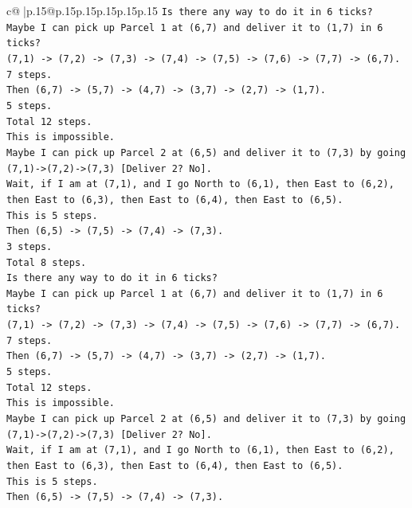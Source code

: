 \documentclass{article}
\begin{document}
{\begin{supertabular}{c@{$\;$}|p{.15\linewidth}@{}p{.15\linewidth}p{.15\linewidth}p{.15\linewidth}p{.15\linewidth}p{.15\linewidth}}
{{{\texttt{Is there any way to do it in 6 ticks?} \\
\texttt{Maybe I can pick up Parcel 1 at (6,7) and deliver it to (1,7) in 6 ticks?} \\
\texttt{(7,1) {-}> (7,2) {-}> (7,3) {-}> (7,4) {-}> (7,5) {-}> (7,6) {-}> (7,7) {-}> (6,7).} \\
\texttt{7 steps.} \\
\texttt{Then (6,7) {-}> (5,7) {-}> (4,7) {-}> (3,7) {-}> (2,7) {-}> (1,7).} \\
\texttt{5 steps.} \\
\texttt{Total 12 steps.} \\
\texttt{This is impossible.} \\
\texttt{Maybe I can pick up Parcel 2 at (6,5) and deliver it to (7,3) by going (7,1){-}>(7,2){-}>(7,3) {[}Deliver 2? No{]}.} \\
\texttt{Wait, if I am at (7,1), and I go North to (6,1), then East to (6,2), then East to (6,3), then East to (6,4), then East to (6,5).} \\
\texttt{This is 5 steps.} \\
\texttt{Then (6,5) {-}> (7,5) {-}> (7,4) {-}> (7,3).} \\
\texttt{3 steps.} \\
\texttt{Total 8 steps.} \\
\texttt{Is there any way to do it in 6 ticks?} \\
\texttt{Maybe I can pick up Parcel 1 at (6,7) and deliver it to (1,7) in 6 ticks?} \\
\texttt{(7,1) {-}> (7,2) {-}> (7,3) {-}> (7,4) {-}> (7,5) {-}> (7,6) {-}> (7,7) {-}> (6,7).} \\
\texttt{7 steps.} \\
\texttt{Then (6,7) {-}> (5,7) {-}> (4,7) {-}> (3,7) {-}> (2,7) {-}> (1,7).} \\
\texttt{5 steps.} \\
\texttt{Total 12 steps.} \\
\texttt{This is impossible.} \\
\texttt{Maybe I can pick up Parcel 2 at (6,5) and deliver it to (7,3) by going (7,1){-}>(7,2){-}>(7,3) {[}Deliver 2? No{]}.} \\
\texttt{Wait, if I am at (7,1), and I go North to (6,1), then East to (6,2), then East to (6,3), then East to (6,4), then East to (6,5).} \\
\texttt{This is 5 steps.} \\
\texttt{Then (6,5) {-}> (7,5) {-}> (7,4) {-}> (7,3).} \\
}}}
\end{supertabular}}
\end{document}

